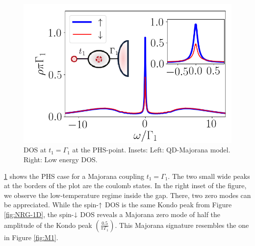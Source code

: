 \begin{figure}[t]
\centering
\includegraphics[scale=0.5]{IMAGES/Majorana/NRG_M1.png}
\caption{ \label{fig:NRG-1M} DOS at $t_1 = \Gamma_1$ at the PHS-point.  Insets: Left: QD-Majorana model. Right: Low energy DOS. \protect{}}

\end{figure}



 \ref{fig:NRG-1M} shows the PHS case for a Majorana coupling $t_1=\Gamma_1$. The two small wide peaks at the borders of the plot are the coulomb states. In the right inset of the figure, we observe the low-temperature regime inside the gap. There, two zero modes can be appreciated.  While the spin-$\uparrow$ DOS is the same Kondo peak from Figure \ref{fig:NRG-1D}, the spin-$\downarrow$ DOS reveals a Majorana zero mode of half the amplitude of the Kondo peak $\left(\frac{0.5}{\pi\Gamma_1}\right)$.  This  Majorana signature resembles the one in Figure \ref{fig:M1}.


